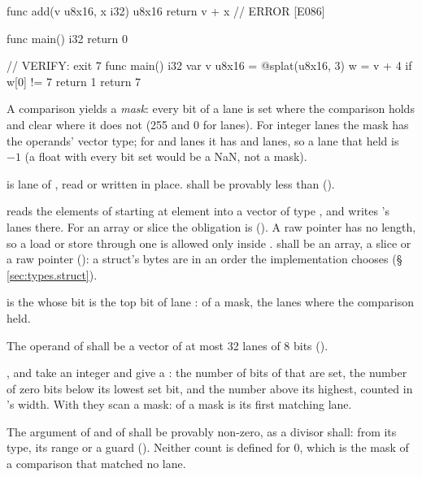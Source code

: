 \begin{laincode}
func add(v u8x16, x i32) u8x16 {
    return v + x    // ERROR [E086]
}

func main() i32 {
    return 0
}
\end{laincode}

\begin{laincode}
// VERIFY: exit 7
func main() i32 {
    var v u8x16 = @splat(u8x16, 3)
    w = v + 4
    if w[0] != 7 { return 1 }
    return 7
}
\end{laincode}

\pnum
A comparison yields a \emph{mask}: every bit of a lane is set where the comparison holds and
clear where it does not (255 and 0 for  lanes). For integer lanes the mask has the
operands' vector type; for  and  lanes it has  and 
lanes, so a lane that held is $-1$ (a float with every bit set would be a NaN, not a mask).

\pnum
{} is lane  of , read or written in place.  shall be provably
less than  ().

\pnum
{} reads the  elements of  starting at element  into
a vector of type , and  writes 's lanes there. For an
array or slice  the obligation is  (). A raw pointer
has no length, so a load or store through one is allowed only inside . 
shall be an array, a slice or a raw pointer (): a struct's bytes are in an order
the implementation chooses (\S\,\ref{sec:types.struct}).

\pnum
{} is the  whose bit  is the top bit of lane : of a
mask, the lanes where the comparison held.

\begin{constraint}
  The operand of  shall be a vector of at most 32 lanes of 8 bits
  ().
\end{constraint}

\pnum
{},  and  take an integer and give a :
the number of bits of  that are set, the number of zero bits below its lowest set bit,
and the number above its highest, counted in 's width. With  they scan a
mask:  of a mask is its first matching lane.

\begin{constraint}
  The argument of  and of  shall be provably non-zero, as a divisor shall:
  from its type, its range or a guard (). Neither count is defined for 0, which
  is the mask of a comparison that matched no lane.
\end{constraint}

